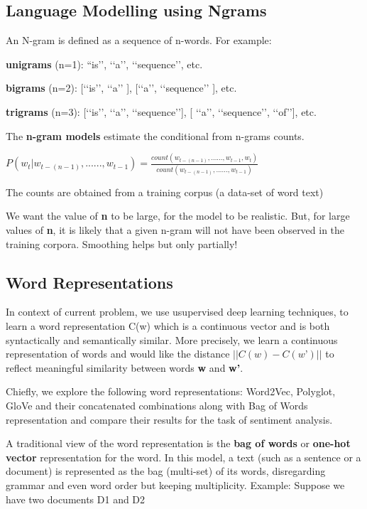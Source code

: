 \subsection{Language Modelling using Ngrams}

An N-gram is defined as a sequence of n-words. For example:

\textbf{unigrams} (n=1): “is’’, ‘‘a’’, ‘‘sequence’’, etc.

\textbf{bigrams} (n=2): [‘‘is’’, ‘‘a’’ ], [‘‘a’’, ‘‘sequence’’ ], etc.

\textbf{trigrams} (n=3): [‘‘is’’, ‘‘a’’, ‘‘sequence’’], [ ‘‘a’’, ‘‘sequence’’, ‘‘of’’], etc.

The \textbf{n-gram models} estimate the conditional from n-grams counts.

\begin{center}
$P({w}_{t} | {w}_{t - (n-1)}  , ...... , {w}_{t-1}) = \frac{count({w}_{t - (n-1)}  , ...... , {w}_{t-1}, {w}_{t} )}{count({w}_{t - (n-1)}  , ...... , {w}_{t-1})}$

\end{center}
The counts are obtained from a training corpus (a data-set of word text)

We want the value of \textbf{n} to be large, for the model to be realistic. But, for large values of \textbf{n}, it is likely that a given n-gram will not have been observed in the training corpora. Smoothing helps but only partially!

\subsection{Word Representations}
In context of current problem, we use usupervised deep learning techniques, to learn a word representation C(w) which is a continuous vector and is both syntactically and semantically similar. 
More precisely, we learn a continuous representation of words and would like the distance $||C(w)-C(w’)||$ to reflect meaningful similarity between words \textbf{w} and \textbf{w’}.

Chiefly, we explore the following word representations: Word2Vec, Polyglot, GloVe and their concatenated combinations along with Bag of Words representation and compare their results for the task of sentiment analysis.
\newline

A traditional view of the word representation is the \textbf{bag of words} or \textbf{one-hot vector} representation for the word. In this model, a text (such as a sentence or a document) is represented as the bag (multi-set) of its words, disregarding grammar and even word order but keeping multiplicity. Example: Suppose we have two documents D1 and D2
\newline

